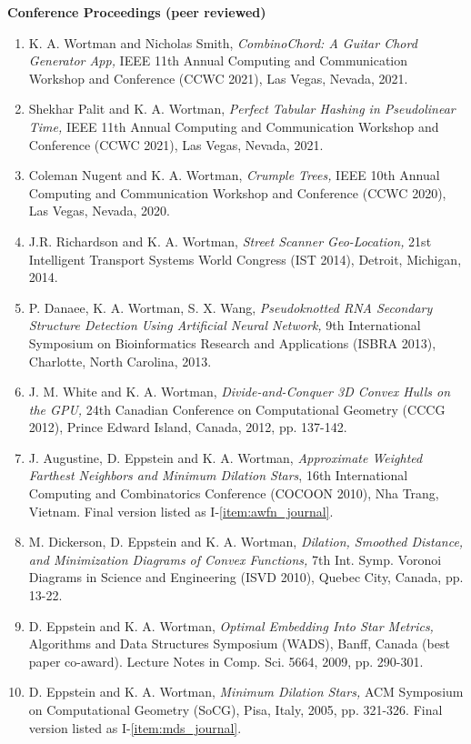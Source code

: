 \documentclass[11pt]{letter}
\begin{document}
\renewcommand{\labelenumi}{C-\arabic{enumi}.}
\textbf{Conference Proceedings (peer reviewed)}
\begin{enumerate}
\item \label{item:ccwc21smith} K. A. Wortman and Nicholas Smith, \emph{CombinoChord: A Guitar Chord Generator App,} IEEE 11th Annual Computing and Communication Workshop and Conference (CCWC 2021), Las Vegas, Nevada, 2021.
\item \label{item:ccwc21palit} Shekhar Palit and K. A. Wortman, \emph{Perfect Tabular Hashing in Pseudolinear Time,} IEEE 11th Annual Computing and Communication Workshop and Conference (CCWC 2021), Las Vegas, Nevada, 2021.
\item \label{item:ccwc20} Coleman Nugent and K. A. Wortman, \emph{Crumple Trees,} IEEE 10th Annual Computing and Communication Workshop and Conference (CCWC 2020), Las Vegas, Nevada, 2020.
\item \label{item:its14} J.R. Richardson and K. A. Wortman, \emph{Street Scanner Geo-Location,} 21st Intelligent Transport Systems World Congress (IST 2014), Detroit, Michigan, 2014.
\item \label{item:isbra13} P. Danaee, K. A. Wortman, S. X. Wang, \emph{Pseudoknotted RNA Secondary Structure Detection Using Artificial Neural Network,} 9th International Symposium on Bioinformatics Research and Applications (ISBRA 2013), Charlotte, North Carolina, 2013.
\item \label{item:cccg12} J. M. White and K. A. Wortman, \emph{Divide-and-Conquer 3D Convex Hulls on the GPU,} 24th Canadian Conference on Computational Geometry (CCCG 2012), Prince Edward Island, Canada, 2012, pp. 137-142.
\item \label{item:awfn_conference} J. Augustine, D. Eppstein and K. A. Wortman, \emph{Approximate Weighted Farthest Neighbors and Minimum Dilation Stars}, 16th International Computing and Combinatorics Conference (COCOON 2010), Nha Trang, Vietnam.  Final version listed as I-\ref{item:awfn_journal}.
\item M. Dickerson, D. Eppstein and K. A. Wortman, \emph{Dilation, Smoothed Distance, and Minimization Diagrams of Convex Functions,} 7th Int. Symp. Voronoi Diagrams in Science and Engineering (ISVD 2010), Quebec City, Canada, pp. 13-22.
\item \label{item:star_metrics} D. Eppstein and K. A. Wortman, \emph{Optimal Embedding Into Star Metrics,} Algorithms and Data Structures Symposium (WADS), Banff, Canada (best paper co-award).  Lecture Notes in Comp. Sci. 5664, 2009, pp. 290-301.
\item \label{item:mds_conference} D. Eppstein and K. A. Wortman, \emph{Minimum Dilation Stars,} ACM Symposium on Computational Geometry (SoCG), Pisa, Italy, 2005, pp. 321-326.  Final version listed as I-\ref{item:mds_journal}.
\end{enumerate}
\end{document}

